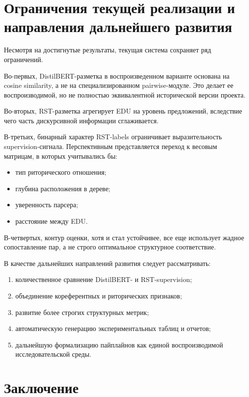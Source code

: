\documentclass[12pt,a4paper]{article}
\begin{document}
\section{Ограничения текущей реализации и направления дальнейшего развития}

Несмотря на достигнутые результаты, текущая система сохраняет ряд ограничений.

Во-первых, DistilBERT-разметка в воспроизведенном варианте основана на cosine similarity,
а не на специализированном pairwise-модуле. Это делает ее воспроизводимой, но не
полностью эквивалентной исторической версии проекта.

Во-вторых, RST-разметка агрегирует EDU на уровень предложений, вследствие чего часть
дискурсивной информации сглаживается.

В-третьих, бинарный характер RST-labels ограничивает выразительность supervision-сигнала.
Перспективным представляется переход к весовым матрицам, в которых учитывались бы:

\begin{itemize}
    \item тип риторического отношения;
    \item глубина расположения в дереве;
    \item уверенность парсера;
    \item расстояние между EDU.
\end{itemize}

В-четвертых, контур оценки, хотя и стал устойчивее, все еще использует жадное
сопоставление пар, а не строго оптимальное структурное соответствие.

В качестве дальнейших направлений развития следует рассматривать:

\begin{enumerate}
    \item количественное сравнение DistilBERT- и RST-supervision;
    \item объединение кореферентных и риторических признаков;
    \item развитие более строгих структурных метрик;
    \item автоматическую генерацию экспериментальных таблиц и отчетов;
    \item дальнейшую формализацию пайплайнов как единой воспроизводимой исследовательской
    среды.
\end{enumerate}

\section{Заключение}
\end{document}

